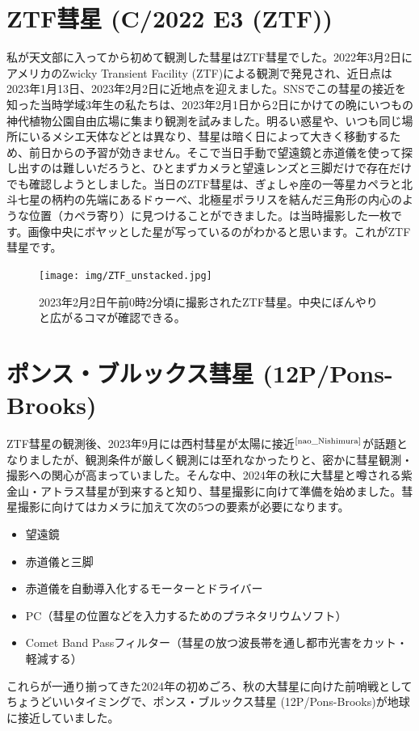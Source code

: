 \documentclass[../../super_nova_2024]{subfiles}
\begin{document}
\section{ZTF彗星 (C/2022 E3 (ZTF))}

私が天文部に入ってから初めて観測した彗星はZTF彗星でした。2022年3月2日にアメリカのZwicky Transient Facility (ZTF)による観測で発見され、近日点は2023年1月13日、2023年2月2日に近地点を迎えました。SNSでこの彗星の接近を知った当時学域3年生の私たちは、2023年2月1日から2日にかけての晩にいつもの神代植物公園自由広場に集まり観測を試みました。明るい惑星や、いつも同じ場所にいるメシエ天体などとは異なり、彗星は暗く日によって大きく移動するため、前日からの予習が効きません。そこで当日手動で望遠鏡と赤道儀を使って探し出すのは難しいだろうと、ひとまずカメラと望遠レンズと三脚だけで存在だけでも確認しようとしました。当日のZTF彗星は、ぎょしゃ座の一等星カペラと北斗七星の柄杓の先端にあるドゥーべ、北極星ポラリスを結んだ三角形の内心のような位置（カペラ寄り）に見つけることができました。は当時撮影した一枚です。画像中央にボヤッとした星が写っているのがわかると思います。これがZTF彗星です。

\begin{figure}
    \centering
    \texttt{[image: img/ZTF\_unstacked.jpg]}
    \caption{2023年2月2日午前0時2分頃に撮影されたZTF彗星。中央にぼんやりと広がるコマが確認できる。}
    \label{fig:ZTF}
\end{figure}


\section{ポンス・ブルックス彗星 (12P/Pons-Brooks)}

ZTF彗星の観測後、2023年9月には西村彗星が太陽に接近$^\text{\cite{nao_Nishimura}}$が話題となりましたが、観測条件が厳しく観測には至れなかったりと、密かに彗星観測・撮影への関心が高まっていました。そんな中、2024年の秋に大彗星と噂される紫金山・アトラス彗星が到来すると知り、彗星撮影に向けて準備を始めました。彗星撮影に向けてはカメラに加えて次の5つの要素が必要になります。
\begin{itemize}
    \item 望遠鏡
    \item 赤道儀と三脚
    \item 赤道儀を自動導入化するモーターとドライバー
    \item PC（彗星の位置などを入力するためのプラネタリウムソフト）
    \item Comet Band Passフィルター（彗星の放つ波長帯を通し都市光害をカット・軽減する）
\end{itemize}
これらが一通り揃ってきた2024年の初めごろ、秋の大彗星に向けた前哨戦としてちょうどいいタイミングで、ポンス・ブルックス彗星 (12P/Pons-Brooks)が地球に接近していました。
\end{document}
